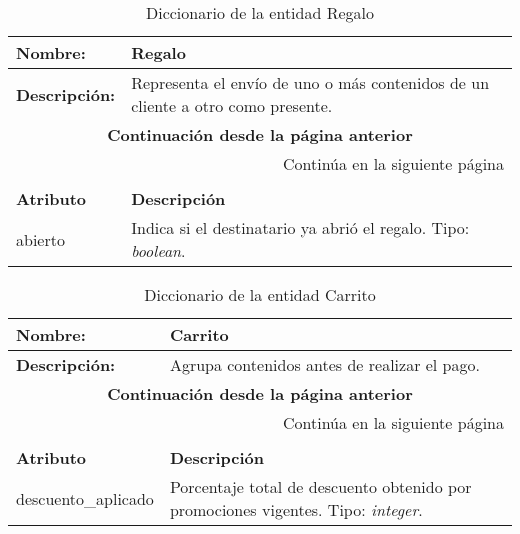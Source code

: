 \renewcommand{\arraystretch}{1.3}
\begin{longtable}{|p{3.5cm}|p{10cm}|}
\caption{Diccionario de la entidad Regalo}
\label{tab:diccionarioRegalo} \\ \hline
\textbf{Nombre:} & Regalo \\ \hline
\textbf{Descripción:} & 
Representa el envío de uno o más contenidos de un cliente a otro como presente. \\ \hline
\endfirsthead
\multicolumn{2}{c}{\textbf{Continuación desde la página anterior}} \\ \hline
\endhead
\hline \multicolumn{2}{r}{{Continúa en la siguiente página}} \\ \hline
\endfoot
\hline
\endlastfoot
\multicolumn{2}{|p{13.5cm}|}{\textbf{ATRIBUTOS}} \\ \hline
\textbf{Atributo} & \textbf{Descripción} \\ \hline
abierto & Indica si el destinatario ya abrió el regalo.  
Tipo: \textit{boolean}. \\ \hline
\end{longtable}

\renewcommand{\arraystretch}{1.3}
\begin{longtable}{|p{3.5cm}|p{10cm}|}
\caption{Diccionario de la entidad Carrito}
\label{tab:diccionarioCarrito} \\ \hline
\textbf{Nombre:} & Carrito \\ \hline
\textbf{Descripción:} & 
Agrupa contenidos antes de realizar el pago. \\ \hline
\endfirsthead
\multicolumn{2}{c}{\textbf{Continuación desde la página anterior}} \\ \hline
\endhead
\hline \multicolumn{2}{r}{{Continúa en la siguiente página}} \\ \hline
\endfoot
\hline
\endlastfoot
\multicolumn{2}{|p{13.5cm}|}{\textbf{ATRIBUTOS}} \\ \hline
\textbf{Atributo} & \textbf{Descripción} \\ \hline
descuento\_aplicado & Porcentaje total de descuento obtenido por promociones vigentes.  
Tipo: \textit{integer}. \\ \hline
\end{longtable}

